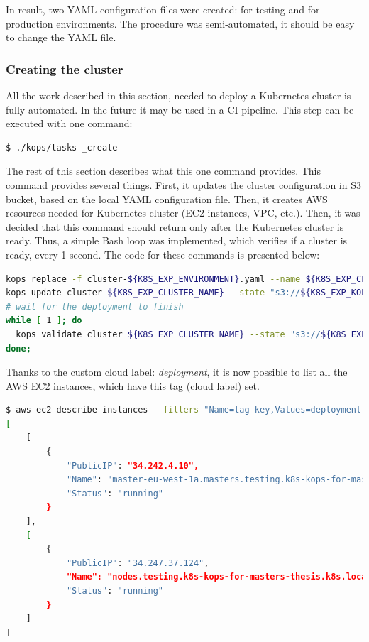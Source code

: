 In result, two YAML configuration files were created: for testing and for production environments. The procedure was semi-automated, it should be easy to change the YAML file.

\subsubsection{Creating the cluster}
\label{kops-creating-the-cluster}
All the work described in this section, needed to deploy a Kubernetes cluster is fully automated. In the future it may be used in a CI pipeline. This step can be executed with one command:
\begin{lstlisting}[basicstyle=\tiny,caption={TODO},captionpos=b,language=Bash,xleftmargin=1cm]
$ ./kops/tasks _create
\end{lstlisting}

The rest of this section describes what this one command provides. This command provides several things. First, it updates the cluster configuration in S3 bucket, based on the local YAML configuration file. Then, it creates AWS resources needed for Kubernetes cluster (EC2 instances, VPC, etc.). Then, it was decided that this command should return only after the Kubernetes cluster is ready. Thus, a simple Bash loop was implemented, which verifies if a cluster is ready, every 1 second. The code for these commands is presented below:
\begin{lstlisting}[basicstyle=\tiny,caption={TODO},captionpos=b,language=Bash,xleftmargin=1cm]
kops replace -f cluster-${K8S_EXP_ENVIRONMENT}.yaml --name ${K8S_EXP_CLUSTER_NAME} --state "s3://${K8S_EXP_KOPS_S3_BUCKET}"
kops update cluster ${K8S_EXP_CLUSTER_NAME} --state "s3://${K8S_EXP_KOPS_S3_BUCKET}" --yes
# wait for the deployment to finish
while [ 1 ]; do
  kops validate cluster ${K8S_EXP_CLUSTER_NAME} --state "s3://${K8S_EXP_KOPS_S3_BUCKET}" && break || sleep 30
done;
\end{lstlisting}

Thanks to the custom cloud label: \textit{deployment}, it is now possible to list all the AWS EC2 instances, which have this tag (cloud label) set.
\begin{lstlisting}[basicstyle=\tiny,caption={TODO},captionpos=b,language=Bash,xleftmargin=1cm]
$ aws ec2 describe-instances --filters "Name=tag-key,Values=deployment" --query "Reservations[*].Instances[*].{PublicIP:PublicIpAddress,Name:Tags[?Key=='Name']|[0].Value,Status:State.Name}"
[
    [
        {
            "PublicIP": "34.242.4.10",
            "Name": "master-eu-west-1a.masters.testing.k8s-kops-for-masters-thesis.k8s.local",
            "Status": "running"
        }
    ],
    [
        {
            "PublicIP": "34.247.37.124",
            "Name": "nodes.testing.k8s-kops-for-masters-thesis.k8s.local",
            "Status": "running"
        }
    ]
]
\end{lstlisting}

